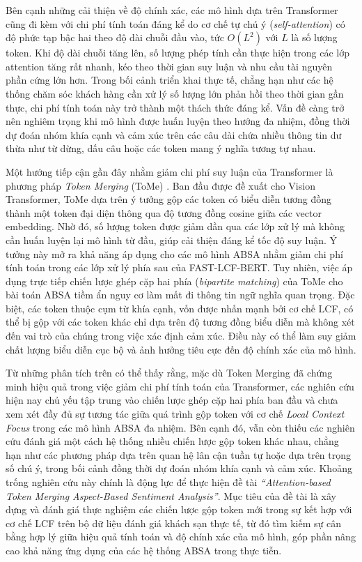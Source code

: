 Bên cạnh những cải thiện về độ chính xác, các mô hình dựa trên Transformer cũng đi kèm với chi phí tính toán đáng kể do cơ chế tự chú ý (\textit{self-attention}) có độ phức tạp bậc hai theo độ dài chuỗi đầu vào, tức $O(L^2)$ với $L$ là số lượng token. Khi độ dài chuỗi tăng lên, số lượng phép tính cần thực hiện trong các lớp attention tăng rất nhanh, kéo theo thời gian suy luận và nhu cầu tài nguyên phần cứng lớn hơn. Trong bối cảnh triển khai thực tế, chẳng hạn như các hệ thống chăm sóc khách hàng cần xử lý số lượng lớn phản hồi theo thời gian gần thực, chi phí tính toán này trở thành một thách thức đáng kể. Vấn đề càng trở nên nghiêm trọng khi mô hình được huấn luyện theo hướng đa nhiệm, đồng thời dự đoán nhóm khía cạnh và cảm xúc trên các câu dài chứa nhiều thông tin dư thừa như từ dừng, dấu câu hoặc các token mang ý nghĩa tương tự nhau.

Một hướng tiếp cận gần đây nhằm giảm chi phí suy luận của Transformer là phương pháp \textit{Token Merging} (ToMe) \cite{bolya2023tome}. Ban đầu được đề xuất cho Vision Transformer, ToMe dựa trên ý tưởng gộp các token có biểu diễn tương đồng thành một token đại diện thông qua độ tương đồng cosine giữa các vector embedding. Nhờ đó, số lượng token được giảm dần qua các lớp xử lý mà không cần huấn luyện lại mô hình từ đầu, giúp cải thiện đáng kể tốc độ suy luận. Ý tưởng này mở ra khả năng áp dụng cho các mô hình ABSA nhằm giảm chi phí tính toán trong các lớp xử lý phía sau của FAST-LCF-BERT. Tuy nhiên, việc áp dụng trực tiếp chiến lược ghép cặp hai phía (\textit{bipartite matching}) của ToMe cho bài toán ABSA tiềm ẩn nguy cơ làm mất đi thông tin ngữ nghĩa quan trọng. Đặc biệt, các token thuộc cụm từ khía cạnh, vốn được nhấn mạnh bởi cơ chế LCF, có thể bị gộp với các token khác chỉ dựa trên độ tương đồng biểu diễn mà không xét đến vai trò của chúng trong việc xác định cảm xúc. Điều này có thể làm suy giảm chất lượng biểu diễn cục bộ và ảnh hưởng tiêu cực đến độ chính xác của mô hình.

Từ những phân tích trên có thể thấy rằng, mặc dù Token Merging đã chứng minh hiệu quả trong việc giảm chi phí tính toán của Transformer, các nghiên cứu hiện nay chủ yếu tập trung vào chiến lược ghép cặp hai phía ban đầu và chưa xem xét đầy đủ sự tương tác giữa quá trình gộp token với cơ chế \textit{Local Context Focus} trong các mô hình ABSA đa nhiệm. Bên cạnh đó, vẫn còn thiếu các nghiên cứu đánh giá một cách hệ thống nhiều chiến lược gộp token khác nhau, chẳng hạn như các phương pháp dựa trên quan hệ lân cận tuần tự hoặc dựa trên trọng số chú ý, trong bối cảnh đồng thời dự đoán nhóm khía cạnh và cảm xúc. Khoảng trống nghiên cứu này chính là động lực để thực hiện đề tài \textit{``Attention-based Token Merging Aspect-Based Sentiment Analysis''}. Mục tiêu của đề tài là xây dựng và đánh giá thực nghiệm các chiến lược gộp token mới trong sự kết hợp với cơ chế LCF trên bộ dữ liệu đánh giá khách sạn thực tế, từ đó tìm kiếm sự cân bằng hợp lý giữa hiệu quả tính toán và độ chính xác của mô hình, góp phần nâng cao khả năng ứng dụng của các hệ thống ABSA trong thực tiễn.

